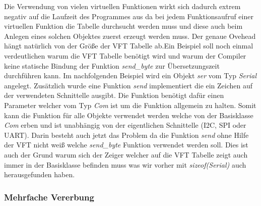 \documentclass[MES,Master,ngerman]{twbook}%
\begin{document}
Die Verwendung von vielen virtuellen Funktionen wirkt sich dadurch extrem negativ auf die Laufzeit des Programmes aus da bei jedem Funktionsaufruf einer virtuellen Funktion die Tabelle durchsucht werden muss und diese auch beim Anlegen eines solchen Objektes zuerst erzeugt werden muss. Der genaue Ovehead hängt natürlich von der Größe der VFT Tabelle ab.\newline \newline Ein Beispiel soll noch einmal verdeutlichen warum die VFT Tabelle benötigt wird und warum der Compiler keine statische Bindung der Funktion \textit{send\_byte} zur Übersetzungszeit durchführen kann. Im nachfolgenden Beispiel wird ein Objekt \textit{ser} vom Typ \textit{Serial} angelegt. Zusätzlich wurde eine Funktion \textit{send} implementiert die ein Zeichen auf der verwendeten Schnittelle ausgibt. Die Funktion benötigt dafür einen Parameter welcher vom Typ \textit{Com} ist um die Funktion allgemein zu halten. Somit kann die Funktion für alle Objekte verwendet werden welche von der Basisklasse \textit{Com} erben und ist unabhängig von der eigentlichen Schnittelle (I2C, SPI oder UART). Darin besteht auch jetzt das Problem da die Funktion \textit{send} ohne Hilfe der VFT nicht weiß welche \textit{send\_byte} Funktion verwendet werden soll. Dies ist auch der Grund warum sich der Zeiger welcher auf die VFT Tabelle zeigt auch immer in der Basisklasse befinden muss was wir vorher mit \textit{sizeof(Serial)} auch herausgefunden haben.\newline

\begin{figure}[!htb]

		
		\label{fig:36}


\end{figure}


\subsubsection{Mehrfache Vererbung}
\end{document}
